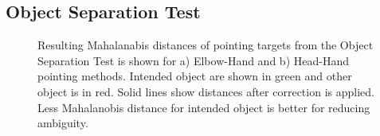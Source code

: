 \documentclass[12pt]{gatech-thesis}
\begin{document}
\subsection{Object Separation Test}

\begin{figure}[ht!]
\centering
%
    \caption{%
	Resulting Mahalanabis distances of pointing targets from the Object Separation Test is shown for a) Elbow-Hand and b) Head-Hand pointing methods. Intended object are shown in green and other object is in red. Solid lines show distances after correction is applied. Less Mahalanobis distance for intended object is better for reducing ambiguity.
     }%
   \label{fig:pointing_graphs}
\end{figure}
\end{document}
